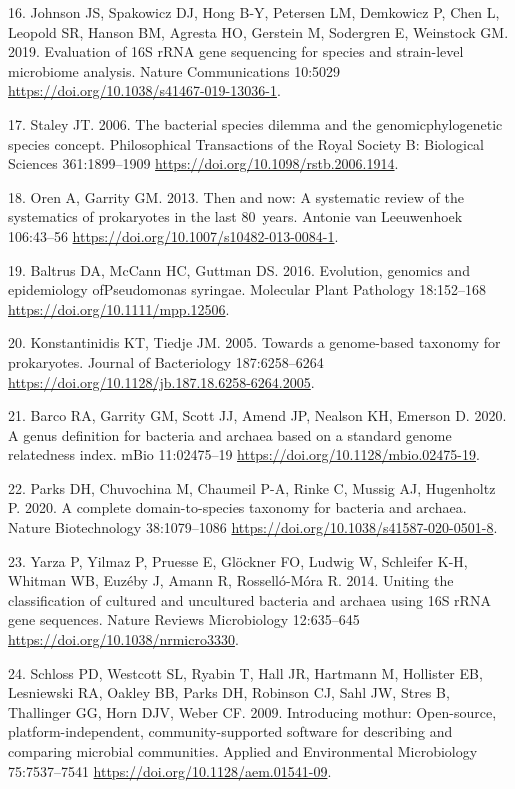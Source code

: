 \documentclass[
]{article}
\newenvironment{cslreferences}%
  {}%
  {\par}
\begin{document}
\begin{cslreferences}
\leavevmode\hypertarget{ref-Johnson2019}{}%
16. Johnson JS, Spakowicz DJ, Hong B-Y, Petersen LM, Demkowicz P, Chen
L, Leopold SR, Hanson BM, Agresta HO, Gerstein M, Sodergren E, Weinstock
GM. 2019. Evaluation of 16S rRNA gene sequencing for species and
strain-level microbiome analysis. Nature Communications 10:5029
\url{https://doi.org/10.1038/s41467-019-13036-1}.

\leavevmode\hypertarget{ref-Staley2006}{}%
17. Staley JT. 2006. The bacterial species dilemma and the
genomicphylogenetic species concept. Philosophical Transactions of the
Royal Society B: Biological Sciences 361:1899--1909
\url{https://doi.org/10.1098/rstb.2006.1914}.

\leavevmode\hypertarget{ref-Oren2013}{}%
18. Oren A, Garrity GM. 2013. Then and now: A systematic review of the
systematics of prokaryotes in the last 80~years. Antonie van Leeuwenhoek
106:43--56 \url{https://doi.org/10.1007/s10482-013-0084-1}.

\leavevmode\hypertarget{ref-Baltrus2016}{}%
19. Baltrus DA, McCann HC, Guttman DS. 2016. Evolution, genomics and
epidemiology ofPseudomonas syringae. Molecular Plant Pathology
18:152--168 \url{https://doi.org/10.1111/mpp.12506}.

\leavevmode\hypertarget{ref-Konstantinidis2005}{}%
20. Konstantinidis KT, Tiedje JM. 2005. Towards a genome-based taxonomy
for prokaryotes. Journal of Bacteriology 187:6258--6264
\url{https://doi.org/10.1128/jb.187.18.6258-6264.2005}.

\leavevmode\hypertarget{ref-Barco2020}{}%
21. Barco RA, Garrity GM, Scott JJ, Amend JP, Nealson KH, Emerson D.
2020. A genus definition for bacteria and archaea based on a standard
genome relatedness index. mBio 11:02475--19
\url{https://doi.org/10.1128/mbio.02475-19}.

\leavevmode\hypertarget{ref-Parks2020}{}%
22. Parks DH, Chuvochina M, Chaumeil P-A, Rinke C, Mussig AJ, Hugenholtz
P. 2020. A complete domain-to-species taxonomy for bacteria and archaea.
Nature Biotechnology 38:1079--1086
\url{https://doi.org/10.1038/s41587-020-0501-8}.

\leavevmode\hypertarget{ref-Yarza2014}{}%
23. Yarza P, Yilmaz P, Pruesse E, Glöckner FO, Ludwig W, Schleifer K-H,
Whitman WB, Euzéby J, Amann R, Rosselló-Móra R. 2014. Uniting the
classification of cultured and uncultured bacteria and archaea using 16S
rRNA gene sequences. Nature Reviews Microbiology 12:635--645
\url{https://doi.org/10.1038/nrmicro3330}.

\leavevmode\hypertarget{ref-Schloss2009}{}%
24. Schloss PD, Westcott SL, Ryabin T, Hall JR, Hartmann M, Hollister
EB, Lesniewski RA, Oakley BB, Parks DH, Robinson CJ, Sahl JW, Stres B,
Thallinger GG, Horn DJV, Weber CF. 2009. Introducing mothur:
Open-source, platform-independent, community-supported software for
describing and comparing microbial communities. Applied and
Environmental Microbiology 75:7537--7541
\url{https://doi.org/10.1128/aem.01541-09}.


\end{cslreferences}
\end{document}
